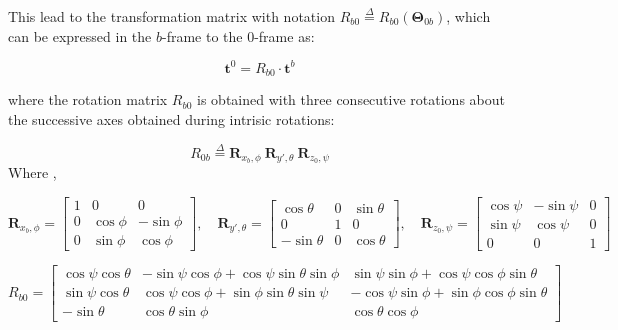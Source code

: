 \documentclass{article}
\begin{document}
This lead to the transformation matrix with notation $ R_{b0}  \stackrel{\Delta}{=}  R_{b0} (\mathbf{\Theta}_{0b})$, which can be expressed in the $b$-frame to the $0$-frame as:

\begin{equation}\label{vectortransform}
\textbf{t}^0 =  R_{b0} \cdot\textbf{t}^b
\end{equation}

where the rotation matrix $ R_{b0} $ is obtained with three consecutive rotations about the successive axes obtained during intrisic rotations:

\begin{equation}
 R_{0b} \stackrel{\Delta}{=} 
\textbf{R}_{x_b,\phi} \: \textbf{R}_{y',\theta} \: \textbf{R}_{z_0,\psi}
\end{equation}
Where \cite{perez2005ship}, 

\begin{equation}
\textbf{R}_{x_b,\phi} = 
\begin{bmatrix}
1 & 0 & 0 \\
0 & \cos \phi &-\sin \phi \\
0 & \sin \phi & \cos \phi
\end{bmatrix}, \quad
\textbf{R}_{y',\theta} =
\begin{bmatrix}
\cos \theta & 0 & \sin \theta \\
0 & 1 & 0 \\
-\sin \theta & 0 & \cos \theta
\end{bmatrix}, \quad
\textbf{R}_{z_0,\psi} =
\begin{bmatrix}
\cos \psi & -\sin \psi & 0 \\
\sin \psi & \cos \psi & 0 \\
0 & 0 & 1
\end{bmatrix}
\end{equation}

\begin{equation}
 R_{b0}  =
\begin{bmatrix}
\cos \psi \cos \theta & -\sin \psi \cos \phi + \cos \psi \sin \theta \sin \phi & \sin \psi \sin \phi + \cos \psi \cos \phi \sin \theta \\
\sin \psi \cos \theta & \cos \psi \cos \phi + \sin \phi \sin \theta \sin \psi & -\cos \psi \sin \phi + \sin \phi \cos \phi \sin \theta \\
- \sin \theta & \cos \theta \sin \phi & \cos \theta \cos \phi
\end{bmatrix}
\end{equation}
\end{document}
